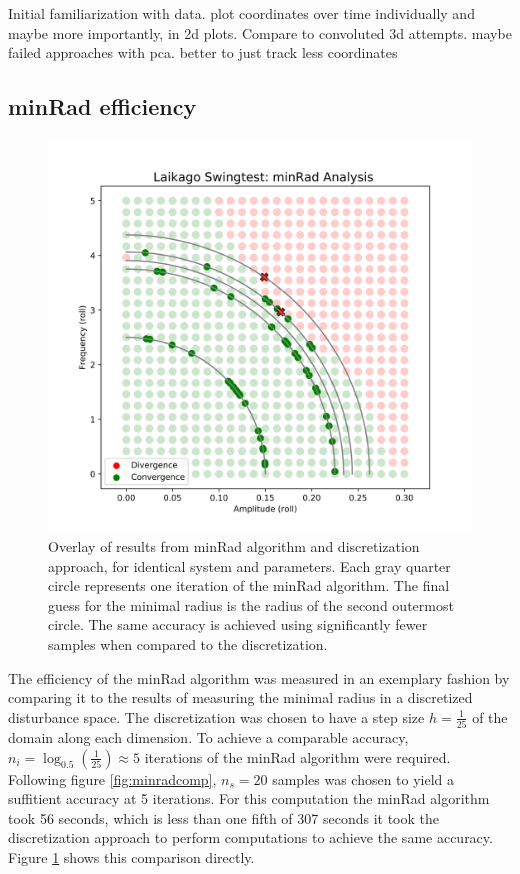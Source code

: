     Initial familiarization with data.
        plot coordinates over time individually and maybe more importantly, in 2d plots. Compare to convoluted 3d attempts. 
        maybe failed approaches with pca. better to just track less coordinates

    \fi
    
    \subsection{minRad efficiency}


    \begin{figure}[hb!]
    \centering
    \includegraphics[width=.5\linewidth]{figures/minrad_analysis_v2.png}
    \caption[minRad Result Analysis]{Overlay of results from minRad algorithm and discretization approach, for identical system and parameters. Each gray quarter circle represents one iteration of the minRad algorithm. The final guess for the minimal radius is the radius of the second outermost circle. The same accuracy is achieved using significantly fewer samples when compared to the discretization.}
    \label{fig:minradanal}
    \end{figure}
    The efficiency of the minRad algorithm was measured in an exemplary fashion by comparing it to the results of measuring the minimal radius in a discretized disturbance space. The discretization was chosen to have a step size $h =\frac{1}{25}$ of the domain along each dimension. To achieve a comparable accuracy, $n_{i} = \log_{0.5}(\frac{1}{25}) \approx 5$ iterations of the minRad algorithm were required. Following figure \ref{fig:minradcomp}, $n_s = 20$ samples was chosen to yield a suffitient accuracy at 5 iterations. For this computation the minRad algorithm took 56 seconds, which is less than one fifth of 307 seconds it took the discretization approach to perform computations to achieve the same accuracy. Figure \ref{fig:minradanal} shows this comparison directly. 

